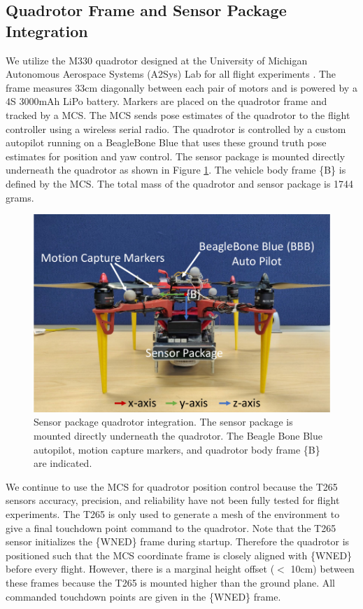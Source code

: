 \subsection{Quadrotor Frame and Sensor Package Integration}

We utilize the M330 quadrotor designed at the University of Michigan Autonomous Aerospace Systems (A2Sys) Lab for all flight experiments \cite{romano_experimental_2019}. The frame measures 33cm diagonally between each pair of motors and is powered by a 4S 3000mAh LiPo battery. Markers are placed on the quadrotor frame and tracked by a \ac{MCS}. The \ac{MCS} sends pose estimates of the quadrotor to the flight controller using a wireless serial radio. The quadrotor is controlled by a custom autopilot running on a BeagleBone Blue that uses these ground truth pose estimates for position and yaw control. The sensor package is mounted directly underneath the quadrotor as shown in Figure \ref{fig:ch7_drone_frame}. The vehicle body frame \{B\} is defined by the \ac{MCS}. The total mass of the quadrotor and sensor package is 1744 grams.

\begin{figure}[!htb]
  \centering
  \includegraphics[page=1,clip,trim=0cm 0cm 0cm 0cm,width=.50\linewidth]{chapter_7_experiments/imgs/drone_with_sensor_package.pdf}
  \caption[Sensor package and quadrotor integration]{Sensor package quadrotor integration. The sensor package is mounted directly underneath the quadrotor. The Beagle Bone Blue autopilot, motion capture markers, and quadrotor body frame \{B\} are indicated.}\label{fig:ch7_drone_frame}
\end{figure}

We continue to use the \ac{MCS} for quadrotor position control because the T265 sensors accuracy, precision, and reliability have not been fully tested for flight experiments. The T265 is only used to generate a mesh of the environment to give a final touchdown point command to the quadrotor. Note that the T265 sensor initializes the \{WNED\} frame during startup. Therefore the quadrotor is positioned such that the \ac{MCS} coordinate frame is closely aligned with \{WNED\} before every flight. However, there is a marginal height offset ($<$ 10cm) between these frames because the T265 is mounted higher than the ground plane. All commanded touchdown points are given in the \{WNED\} frame.

